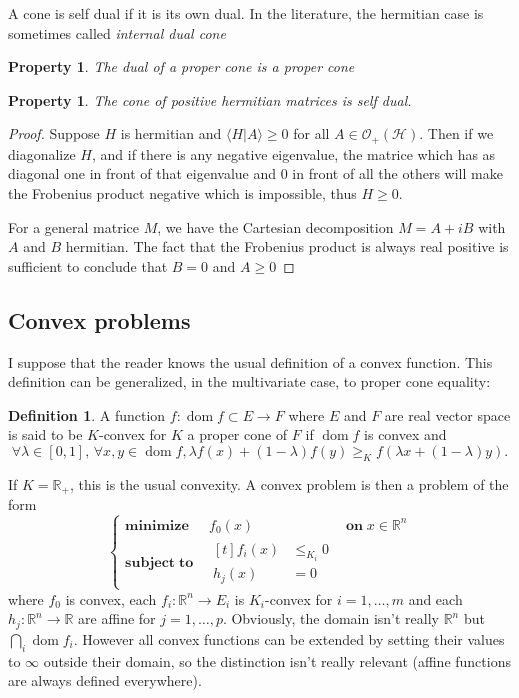 \documentclass[10pt,a4paper]{report}
\theoremstyle{plain}
\newtheorem{prop}[thm]{Property}
\theoremstyle{definition}
\newtheorem{defn}{Definition}[chapter]
\theoremstyle{remark}
\newcommand{\R}{\ensuremath{\mathbb{R}}}
\renewcommand{\geq}{\geqslant}
\renewcommand{\leq}{\leqslant}
\DeclareMathOperator{\dom}{dom}
\newcommand{\minima}[3]{\begin{cases}
    \mathbf{minimize}\;\,\quad #1& \mathbf{on}\; #2\\
    \mathbf{subject\;to}\quad \begin{aligned}[t]#3\end{aligned}
  \end{cases}}
\begin{document}
A cone is self dual if it is its own dual. In the literature, the hermitian case
is sometimes called \emph{internal dual cone}

\begin{prop}
  The dual of a proper cone is a proper cone
\end{prop}


\begin{prop}
  The cone of positive hermitian matrices is self dual.
\end{prop}

\begin{proof}
  Suppose $H$ is hermitian and $\langle H | A \rangle \geq 0$ for all $A \in
  \mathcal{O}_+(\mathcal{H})$. Then if we diagonalize $H$, and if there is any
  negative eigenvalue, the matrice which has as diagonal one in front of that
  eigenvalue and 0 in front of all the others will make the Frobenius product negative
  which is impossible, thus $H \geq 0$.

  For a general matrice $M$, we have the Cartesian decomposition $M = A + iB$
  with $A$ and $B$ hermitian. The fact that the Frobenius product is always real
  positive is sufficient to conclude that $B = 0$ and $A \geq 0$
\end{proof}


\subsection{Convex problems}

I suppose that the reader knows the usual definition of a convex function.
This definition can be generalized, in the multivariate case, to proper cone equality:

\begin{defn}
  A function $f : \dom f \subset E \to F$ where $E$ and $F$ are real vector
  space is said to be $K$-convex for $K$ a proper cone of $F$ if $\dom f$ is
  convex and
  \[\forall \lambda \in [0,1],\, \forall x,y \in \dom f, \lambda f(x) + (1 -
    \lambda)f(y) \geq_K f(\lambda x + (1-\lambda)y).\]
\end{defn}
If $K = \R_+$, this is the usual convexity. A convex problem is then a problem
of the form
\begin{equation}\label{eqn:stdprb}
\minima{f_0(x)}{x \in \R^n}{f_i(x) &\leq_{K_i}0 \\ \!\!h_j(x) &= 0}
\end{equation}
where $f_0$ is convex, each $f_i : \R^n \to E_i$ is $K_i$-convex for $i = 1,\ldots,m$ and each
$h_j : \R^n \to \R$ are affine for $j = 1,\ldots,p$. Obviously, the domain isn't really $\R^n$
but $\bigcap_i \dom f_i$. However all convex
functions can be extended by setting their values to $\infty$ outside their domain,
so the distinction isn't really relevant (affine functions are always defined
everywhere).
\end{document}
